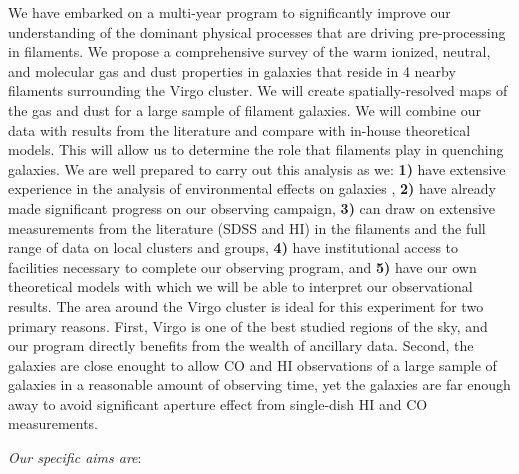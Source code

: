 \documentclass[11pt, preprint]{aastex}
\begin{document}

 We have embarked on a multi-year program to significantly improve our understanding of the dominant physical processes that are driving
  pre-processing in filaments.  
We propose a
comprehensive survey of the warm ionized, neutral, and
molecular gas and dust properties in galaxies that reside in 4 nearby
filaments surrounding the Virgo cluster.  We will
create spatially-resolved maps of the gas and dust for a large sample
of filament galaxies.  We will
combine our data with results from the literature and compare with in-house
theoretical models.  This will allow us to determine the
role that filaments play in quenching galaxies.  We are well prepared to carry
out this analysis as we: \textbf{1)} have extensive experience in the
analysis of environmental effects on galaxies \citep{Poggianti06, Desai07,Rudnick09, Finn10, Cantale16},
\textbf{2)} have already made significant progress on our observing
campaign, \textbf{3)} can draw on extensive measurements from the
literature (SDSS and HI) in the filaments and the full range of data
on local clusters and groups, \textbf{4)} have institutional access to
facilities necessary to complete our observing program, and
\textbf{5)} have our own theoretical models with which we will be able
to interpret our observational results.  The area around the Virgo
cluster is ideal for this experiment for two primary reasons.  First,
Virgo is one of the best studied regions of the sky, and our program
directly benefits from the wealth of ancillary data.  Second, the
galaxies are close enought to allow CO and HI observations of a large
sample of galaxies in a reasonable amount of observing time, yet the galaxies are far enough away to avoid significant aperture effect from single-dish HI and CO measurements.

\textit{Our specific aims are}:

\end{document}

